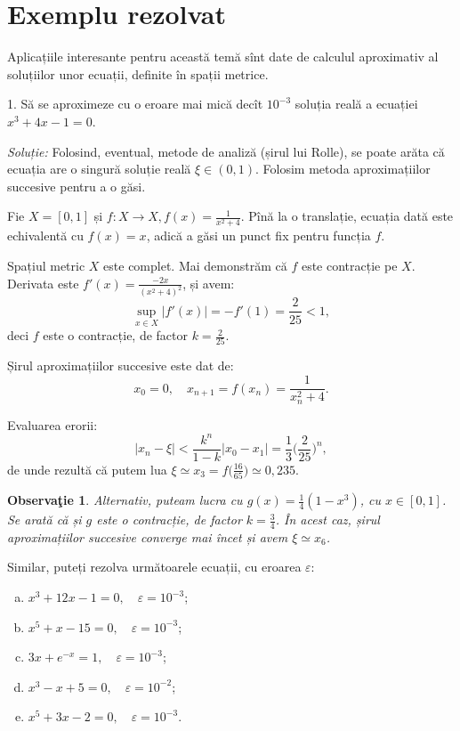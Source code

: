 \documentclass[11pt,a4paper]{article}
\theoremstyle{dotless}
\theoremstyle{dotlessdr}
\newtheorem{remark}{Observa\c{t}ie}[section]
\begin{document}

\section{Exemplu rezolvat}
\label{sec:ex-rez}

Aplicațiile interesante pentru această temă sînt date de calculul aproximativ
al soluțiilor unor ecuații, definite în spații metrice.

1. Să se aproximeze cu o eroare mai mică decît $10^{-3}$ soluția reală a
ecuației $x^3 + 4x - 1 = 0$.

\emph{Soluție:} Folosind, eventual, metode de analiză (șirul lui Rolle),
se poate arăta că ecuația are o singură soluție reală $\xi \in (0, 1)$.
Folosim metoda aproximațiilor succesive pentru a o găsi.

Fie $X = [0, 1]$ și $f: X \to X, f(x) = \frac{1}{x^2 + 4}$. Pînă la o
translație, ecuația dată este echivalentă cu $f(x) = x$, adică a găsi
un punct fix pentru funcția $f$.

Spațiul metric $X$ este complet. Mai demonstrăm că $f$ este contracție
pe $X$. Derivata este $f'(x) = \frac{-2x}{(x^2 + 4)^2}$, și avem:
\[
  \sup_{x \in X} | f'(x) | = -f'(1) = \frac{2}{25} < 1,
\]
deci $f$ este o contracție, de factor $k = \frac{2}{25}$.

Șirul aproximațiilor succesive este dat de:
\[
  x_0 = 0, \quad x_{n + 1} = f(x_n) = \frac{1}{x_n^2 + 4}.
\]

Evaluarea erorii:
\[
  |x_n - \xi| < \frac{k^n}{1 - k}|x_0 - x_1| = \frac{1}{3} \Big( \frac{2}{25} \Big)^n,
\]
de unde rezultă că putem lua $\xi \simeq x_3 = f \big(\frac{16}{65}\big) \simeq 0,235$.

\begin{remark}\label{rk:alternativ}
  Alternativ, puteam lucra cu $g(x) = \frac{1}{4} (1 - x^3)$, cu $x \in [0, 1]$.
  Se arată că și $g$ este o contracție, de factor $k = \frac{3}{4}$. În acest caz,
  șirul aproximațiilor succesive converge mai încet și avem $\xi \simeq x_6$.
\end{remark}

\vspace{1cm}

Similar, puteți rezolva următoarele ecuații, cu eroarea $\varepsilon$:
\begin{enumerate}[(a)]
\item $x^3 + 12x - 1 = 0, \quad \varepsilon = 10^{-3}$;
\item $x^5 + x - 15 = 0, \quad \varepsilon = 10^{-3}$;
\item $3x + e^{-x} = 1, \quad \varepsilon = 10^{-3}$;
\item $x^3 - x + 5 = 0, \quad \varepsilon = 10^{-2}$;
\item $x^5 + 3x - 2 = 0, \quad \varepsilon = 10^{-3}$.
\end{enumerate}
\end{document}
